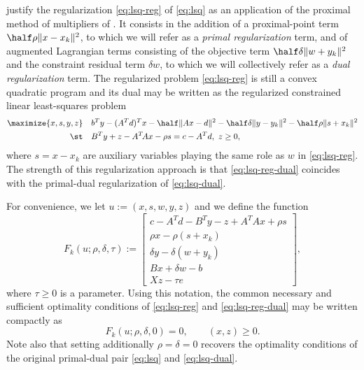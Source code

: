 \documentclass{amsart}
\begin{document}
\cite{friedlander-orban-2012} justify the regularization \eqref{eq:lsq-reg} of
\eqref{eq:lsq} as an application of the proximal method of multipliers of
\cite{rockafellar-1976}. It consists in the addition of a proximal-point term
$\half \rho \|x - x_k\|^2$, to which we will refer as a \textit{primal
regularization} term, and of augmented Lagrangian terms consisting of the
objective term $\half \delta \|w + y_k\|^2$ and the constraint
residual term $\delta w$, to which we will collectively refer as a \textit{dual
regularization} term. The regularized problem \eqref{eq:lsq-reg} is still a
convex quadratic program and its dual may be written as the regularized
constrained linear least-squares problem
\begin{equation}
  \label{eq:lsq-reg-dual}
  \begin{aligned}
    \maximize{x, s, y, z} \quad &
    b^T y - (A^T d)^T x - \half \|Ax - d\|^2 -
    \half \delta \|y - y_k\|^2 - \half \rho \|s + x_k\|^2 \\
    \st \quad & B^T y + z - A^T \! A x - \rho s = c - A^T d, \ z \geq 0,
  \end{aligned}
\end{equation}
where $s = x - x_k$ are auxiliary variables playing the same role as $w$ in
\eqref{eq:lsq-reg}. The strength of this regularization approach is that
\eqref{eq:lsq-reg-dual} coincides with the primal-dual regularization of
\eqref{eq:lsq-dual}.

For convenience, we let $u := (x, s, w, y, z)$ and we define the function
\begin{equation}
  \label{eq:def-F}
  F_k(u; \rho, \delta, \tau) :=
  \begin{bmatrix}
    c - A^T d - B^T y - z + A^T \! A x + \rho s \\
    \rho x - \rho (s + x_k) \\
    \delta y - \delta (w + y_k) \\
    Bx + \delta w - b \\
    X z - \tau e
  \end{bmatrix},
\end{equation}
where $\tau \geq 0$ is a parameter. Using this notation, the common necessary
and sufficient optimality conditions of \eqref{eq:lsq-reg} and
\eqref{eq:lsq-reg-dual} may be written compactly as
\[
  F_k(u; \rho, \delta, 0) = 0,
  \qquad
  (x, z) \geq 0.
\]
Note also that setting additionally $\rho = \delta = 0$ recovers the optimality
conditions of the original primal-dual pair \eqref{eq:lsq} and
\eqref{eq:lsq-dual}.
\end{document}
